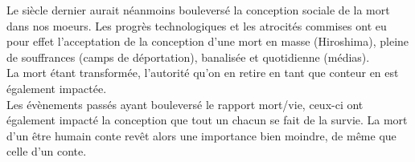 Le siècle dernier aurait néanmoins bouleversé la conception sociale de la mort dans nos moeurs. Les progrès technologiques et les atrocités commises ont eu pour effet l'acceptation de la conception d'une mort en masse (Hiroshima), pleine de souffrances (camps de déportation), banalisée et quotidienne (médias).\\
La mort étant transformée, l'autorité qu'on en retire en tant que conteur en est également impactée.\\
Les évènements passés ayant bouleversé le rapport mort/vie, ceux-ci ont également impacté la conception que tout un chacun se fait de la survie. La mort d'un être humain conte revêt alors une importance bien moindre, de même que celle d'un conte.

\clearpage
